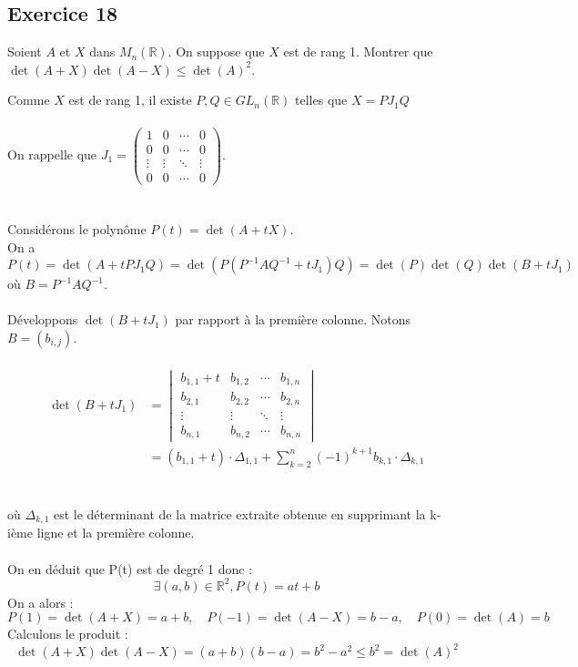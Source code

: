 \documentclass[a4paper,12pt]{article}
\begin{document}
    \subsection*{Exercice 18}
    Soient \( A \) et \( X \) dans \( M_n(\mathbb{R}) \). On suppose que \( X \) est de rang 1. Montrer que \( \det(A + X) \det(A - X) \leq \det(A)^2 \).
    
    \begin{correctionbox}
        Comme \( X \) est de rang 1, il existe \( P, Q \in GL_n(\mathbb{R}) \) telles que \( X = P J_1 Q \) 
        \\ \\
        On rappelle que \( J_1 = \begin{pmatrix} 1 & 0 & \cdots & 0 \\ 0 & 0 & \cdots & 0 \\ \vdots & \vdots & \ddots & \vdots \\ 0 & 0 & \cdots & 0 \end{pmatrix} \). 
        \\ \\ \\
        Considérons le polynôme \( P(t) = \det(A + tX) \). \\
        On a \( P(t) = \det(A + tP J_1 Q) = \det(P(P^{-1}AQ^{-1} + tJ_1)Q) = \det(P)\det(Q)\det(B + tJ_1) \) où \( B = P^{-1}AQ^{-1} \). \\ \\
        Développons \( \det(B + tJ_1) \) par rapport à la première colonne. Notons \( B = (b_{i,j}) \). \\ \\
        \[
        \begin{aligned}
        \det(B + tJ_1) &= \begin{vmatrix}
        b_{1,1} + t & b_{1,2} & \cdots & b_{1,n} \\
        b_{2,1}     & b_{2,2} & \cdots & b_{2,n} \\
        \vdots     & \vdots & \ddots & \vdots \\
        b_{n,1}     & b_{n,2} & \cdots & b_{n,n}
        \end{vmatrix} \\
        &= (b_{1,1} + t) \cdot \Delta_{1,1} + \sum_{k=2}^n (-1)^{k+1} b_{k,1} \cdot \Delta_{k,1}
        \end{aligned}
        \] \\ \\
        où \( \Delta_{k,1} \) est le déterminant de la matrice extraite obtenue en supprimant la k-ième ligne et la première colonne. \\ \\
        On en déduit que P(t) est de degré 1 donc : 
        \[
        \exists (a,b) \in \mathbb{R}^2, P(t) = at + b
        \]
        On a alors :
        \[
        P(1) = \det(A + X) = a + b, \quad P(-1) = \det(A - X) = b - a, \quad P(0) = \det(A) = b
        \]
        Calculons le produit :
        \[
        \det(A + X)\det(A - X) = (a + b)(b - a) = b^2 - a^2 \leq b^2 = \det(A)^2
        \]
    \end{correctionbox}
\end{document}
